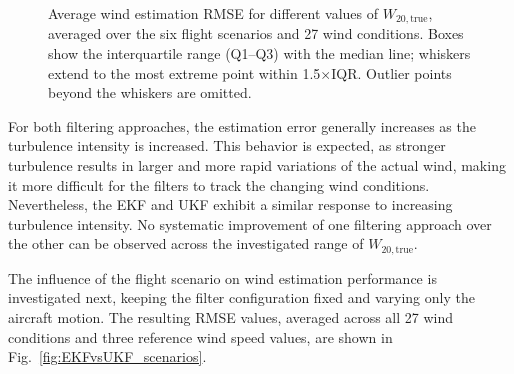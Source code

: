 \begin{figure}[htb]
	\caption{Average wind estimation RMSE for different values of $W_{20,\mathrm{true}}$, averaged over the six flight scenarios and 27 wind conditions. Boxes show the interquartile range (Q1--Q3) with the median line; whiskers extend to the most extreme point within 1.5$\times$IQR. Outlier points beyond the whiskers are omitted.}
	\label{fig:barchart_EKFvsUKF}
\end{figure}

For both filtering approaches, the estimation error generally increases as the turbulence intensity is increased. This behavior is expected, as stronger turbulence results in larger and more rapid variations of the actual wind, making it more difficult for the filters to track the changing wind conditions. Nevertheless, the EKF and UKF exhibit a similar response to increasing turbulence intensity. No systematic improvement of one filtering approach over the other can be observed across the investigated range of $W_{20,\mathrm{true}}$.

The influence of the flight scenario on wind estimation performance is investigated next, keeping the filter configuration fixed and varying only the aircraft motion. The resulting RMSE values, averaged across all 27 wind conditions and three reference wind speed values, are shown in Fig.~\ref{fig:EKFvsUKF_scenarios}.

